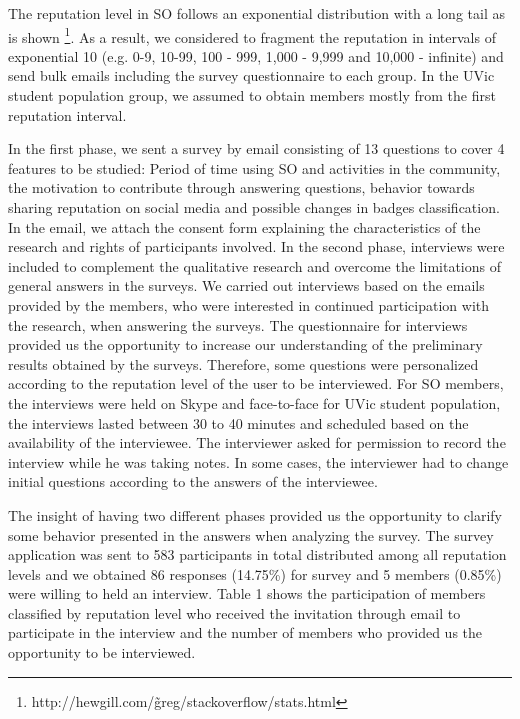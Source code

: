 \documentclass{sigchi}
\begin{document}
The reputation level in SO follows an exponential distribution with a long tail as is shown \footnote{http://hewgill.com/\~greg/stackoverflow/stats.html}. As a result, we considered to fragment the reputation in intervals of exponential 10 (e.g. 0-9, 10-99, 100 - 999, 1,000 - 9,999 and 10,000 - infinite) and send bulk emails including the survey questionnaire to each group. In the UVic student population group, we assumed to obtain members mostly from the first reputation interval.

In the first phase, we sent a survey by email consisting of 13 questions to cover 4 features to be studied: Period of time using SO and activities in the community, the motivation to contribute through answering questions, behavior towards sharing reputation on social media and possible changes in badges classification. In the email, we attach the consent form explaining the characteristics of the research and rights of participants involved. In the second phase, interviews were included to complement the qualitative research and overcome the limitations of general answers in the surveys. We carried out interviews based on the emails provided by the members, who were interested in continued participation with the research, when answering the surveys. The questionnaire for interviews provided us the opportunity to increase our understanding of the preliminary results obtained by the surveys. Therefore, some questions were personalized according to the reputation level of the user to be interviewed. For SO members, the interviews were held on Skype and face-to-face for UVic student population, the interviews lasted between 30 to 40 minutes and  scheduled based on the availability of the interviewee. The interviewer asked for permission to record the interview while he was taking notes. In some cases, the interviewer had to change initial questions according to the answers of the interviewee.


The insight of having two different phases provided us the opportunity to clarify some behavior presented in the answers when analyzing the survey. The survey application was sent to 583 participants in total distributed among all reputation levels and we obtained 86 responses (14.75\%)  for survey and 5 members (0.85\%) were willing to held an interview. Table 1 shows the participation of members classified by reputation level who received the invitation through email to participate in the interview and the number of members who provided us the opportunity to be interviewed.
\end{document}
